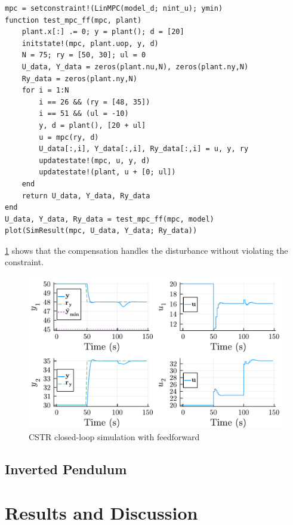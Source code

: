 \begin{verbatim}
mpc = setconstraint!(LinMPC(model_d; nint_u); ymin)
function test_mpc_ff(mpc, plant)
    plant.x[:] .= 0; y = plant(); d = [20]
    initstate!(mpc, plant.uop, y, d)
    N = 75; ry = [50, 30]; ul = 0
    U_data, Y_data = zeros(plant.nu,N), zeros(plant.ny,N)
    Ry_data = zeros(plant.ny,N)
    for i = 1:N
        i == 26 && (ry = [48, 35])
        i == 51 && (ul = -10)
        y, d = plant(), [20 + ul]
        u = mpc(ry, d)
        U_data[:,i], Y_data[:,i], Ry_data[:,i] = u, y, ry
        updatestate!(mpc, u, y, d) 
        updatestate!(plant, u + [0; ul]) 
    end
    return U_data, Y_data, Ry_data
end
U_data, Y_data, Ry_data = test_mpc_ff(mpc, model)
plot(SimResult(mpc, U_data, Y_data; Ry_data))
\end{verbatim}

\cref{fig:plot2_LinMPC} shows that the compensation handles the disturbance without violating the constraint.

\begin{figure}
    \centering
    \includegraphics[width=\columnwidth]{fig/plot2_LinMPC.pdf}
    \caption{CSTR closed-loop simulation with feedforward}
    \label{fig:plot2_LinMPC}
\end{figure}

\subsection{Inverted Pendulum}



\section{Results and Discussion}
\label{sec.results_simple}


